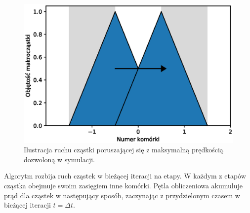 \begin{figure}[h!]
  \includegraphics[width=\textwidth]{Images/deposition-movement}
  \caption{Ilustracja ruchu cząstki poruszającej się z maksymalną prędkością dozwoloną w symulacji.\label{fig:deposition-movement}}
\end{figure}

Algorytm rozbija ruch cząstek w bieżącej iteracji na etapy. W każdym z
etapów cząstka obejmuje swoim zasięgiem inne komórki. Pętla obliczeniowa
akumuluje prąd dla cząstek w następujący sposób, zaczynając z przydzielonym
czasem w bieżącej iteracji $t = \Delta t$.

